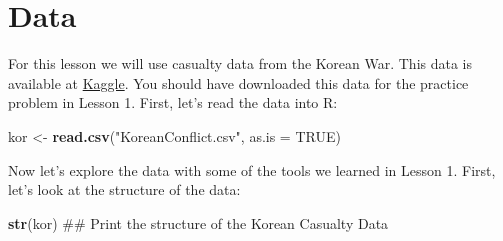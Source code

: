 \documentclass[]{book}
\newenvironment{Shaded}{\begin{snugshade}}{\end{snugshade}}
\newcommand{\KeywordTok}[1]{\textcolor[rgb]{0.13,0.29,0.53}{\textbf{{#1}}}}
\newcommand{\DataTypeTok}[1]{\textcolor[rgb]{0.13,0.29,0.53}{{#1}}}
\newcommand{\StringTok}[1]{\textcolor[rgb]{0.31,0.60,0.02}{{#1}}}
\newcommand{\OtherTok}[1]{\textcolor[rgb]{0.56,0.35,0.01}{{#1}}}
\newcommand{\NormalTok}[1]{{#1}}
\begin{document}
\section{Data}\label{data}

For this lesson we will use casualty data from the Korean War. This data
is available at \href{https://www.kaggle.com/datasets}{Kaggle}. You
should have downloaded this data for the practice problem in Lesson 1.
First, let's read the data into R:

\begin{Shaded}
\begin{Highlighting}[]
\NormalTok{kor <-}\StringTok{ }\KeywordTok{read.csv}\NormalTok{(}\StringTok{"KoreanConflict.csv"}\NormalTok{, }\DataTypeTok{as.is =} \OtherTok{TRUE}\NormalTok{)}
\end{Highlighting}
\end{Shaded}

Now let's explore the data with some of the tools we learned in Lesson
1. First, let's look at the structure of the data:

\begin{Shaded}
\begin{Highlighting}[]
\KeywordTok{str}\NormalTok{(kor)  ## Print the structure of the Korean Casualty Data}
\end{Highlighting}
\end{Shaded}
\end{document}
